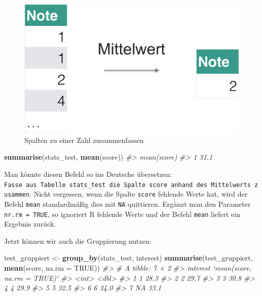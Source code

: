 \documentclass[12pt,ngerman,]{book}
\newenvironment{Shaded}{\begin{snugshade}}{\end{snugshade}}
\newcommand{\KeywordTok}[1]{\textcolor[rgb]{0.13,0.29,0.53}{\textbf{{#1}}}}
\newcommand{\DataTypeTok}[1]{\textcolor[rgb]{0.13,0.29,0.53}{{#1}}}
\newcommand{\StringTok}[1]{\textcolor[rgb]{0.31,0.60,0.02}{{#1}}}
\newcommand{\CommentTok}[1]{\textcolor[rgb]{0.56,0.35,0.01}{\textit{{#1}}}}
\newcommand{\OtherTok}[1]{\textcolor[rgb]{0.56,0.35,0.01}{{#1}}}
\newcommand{\NormalTok}[1]{{#1}}
\renewenvironment{Shaded}{\begin{kframe}}{\end{kframe}}
\begin{document}
\begin{figure}

{\centering \includegraphics[width=0.7\linewidth]{images/Datenjudo/summarise} 

}

\caption{Spalten zu einer Zahl zusammenfassen}\label{fig:fig-summarise}
\end{figure}

\begin{Shaded}
\begin{Highlighting}[]
\KeywordTok{summarise}\NormalTok{(stats_test, }\KeywordTok{mean}\NormalTok{(score))}
\CommentTok{#>   mean(score)}
\CommentTok{#> 1        31.1}
\end{Highlighting}
\end{Shaded}

Man könnte diesen Befehl so ins Deutsche übersetzen:
\texttt{Fasse\ aus\ Tabelle\ stats\_test\ die\ Spalte\ score\ anhand\ des\ Mittelwerts\ zusammen}.
Nicht vergessen, wenn die Spalte \texttt{score} fehlende Werte hat, wird
der Befehl \texttt{mean} standardmäßig dies mit \texttt{NA} quittieren.
Ergänzt man den Parameter \texttt{nr.rm\ =\ TRUE}, so ignoriert R
fehlende Werte und der Befehl \texttt{mean} liefert ein Ergebnis zurück.

Jetzt können wir auch die Gruppierung nutzen:

\begin{Shaded}
\begin{Highlighting}[]
\NormalTok{test_gruppiert <-}\StringTok{ }\KeywordTok{group_by}\NormalTok{(stats_test, interest)}
\KeywordTok{summarise}\NormalTok{(test_gruppiert, }\KeywordTok{mean}\NormalTok{(score, }\DataTypeTok{na.rm =} \OtherTok{TRUE}\NormalTok{))}
\CommentTok{#> # A tibble: 7 × 2}
\CommentTok{#>   interest `mean(score, na.rm = TRUE)`}
\CommentTok{#>      <int>                       <dbl>}
\CommentTok{#> 1        1                        28.3}
\CommentTok{#> 2        2                        29.7}
\CommentTok{#> 3        3                        30.8}
\CommentTok{#> 4        4                        29.9}
\CommentTok{#> 5        5                        32.5}
\CommentTok{#> 6        6                        34.0}
\CommentTok{#> 7       NA                        33.1}
\end{Highlighting}
\end{Shaded}
\end{document}
